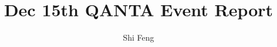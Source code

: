 \documentclass{beamer}
\title[]{Dec 15th QANTA Event Report}
\author{Shi Feng}
\institute{University of Maryland}
\begin{document}
\begin{frame}
\titlepage
\end{frame}












\end{document}
